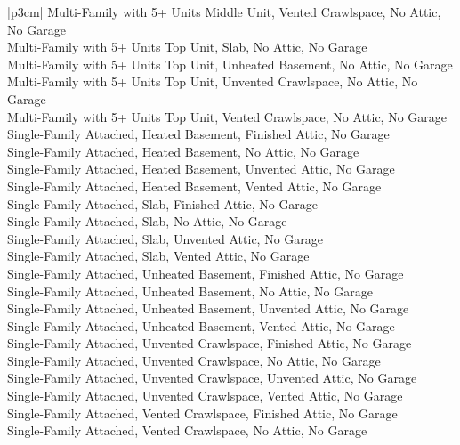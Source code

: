 \begin{customLongTable}{ |p{3cm}| }
Multi-Family with 5+ Units Middle Unit, Vented Crawlspace, No Attic, No Garage \\ \hline
Multi-Family with 5+ Units Top Unit, Slab, No Attic, No Garage \\ \hline
Multi-Family with 5+ Units Top Unit, Unheated Basement, No Attic, No Garage \\ \hline
Multi-Family with 5+ Units Top Unit, Unvented Crawlspace, No Attic, No Garage \\ \hline
Multi-Family with 5+ Units Top Unit, Vented Crawlspace, No Attic, No Garage \\ \hline
Single-Family Attached, Heated Basement, Finished Attic, No Garage \\ \hline
Single-Family Attached, Heated Basement, No Attic, No Garage \\ \hline
Single-Family Attached, Heated Basement, Unvented Attic, No Garage \\ \hline
Single-Family Attached, Heated Basement, Vented Attic, No Garage \\ \hline
Single-Family Attached, Slab, Finished Attic, No Garage \\ \hline
Single-Family Attached, Slab, No Attic, No Garage \\ \hline
Single-Family Attached, Slab, Unvented Attic, No Garage \\ \hline
Single-Family Attached, Slab, Vented Attic, No Garage \\ \hline
Single-Family Attached, Unheated Basement, Finished Attic, No Garage \\ \hline
Single-Family Attached, Unheated Basement, No Attic, No Garage \\ \hline
Single-Family Attached, Unheated Basement, Unvented Attic, No Garage \\ \hline
Single-Family Attached, Unheated Basement, Vented Attic, No Garage \\ \hline
Single-Family Attached, Unvented Crawlspace, Finished Attic, No Garage \\ \hline
Single-Family Attached, Unvented Crawlspace, No Attic, No Garage \\ \hline
Single-Family Attached, Unvented Crawlspace, Unvented Attic, No Garage \\ \hline
Single-Family Attached, Unvented Crawlspace, Vented Attic, No Garage \\ \hline
Single-Family Attached, Vented Crawlspace, Finished Attic, No Garage \\ \hline
Single-Family Attached, Vented Crawlspace, No Attic, No Garage \\ \hline

\end{customLongTable}

